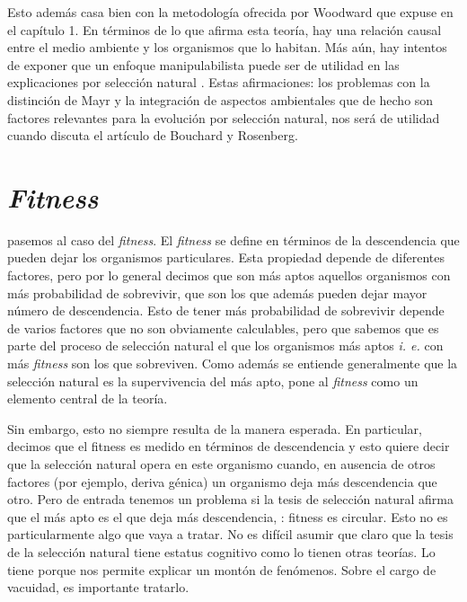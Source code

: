 Esto además casa bien con la metodología ofrecida por Woodward que expuse en el capítulo 1. En términos de lo que afirma esta teoría, hay una relación causal entre el medio ambiente y los organismos que lo habitan. Más aún, hay intentos de exponer que un enfoque manipulabilista puede ser de utilidad en las explicaciones por selección natural \cite{MacColl2011}. Estas afirmaciones: los problemas con la distinción de Mayr y la integración de aspectos ambientales que de hecho son factores relevantes para la evolución por selección natural, nos será de utilidad cuando discuta el artículo de Bouchard y Rosenberg.


\section{\emph{Fitness}}

\noindent pasemos al caso del \emph{fitness}. El \emph{fitness} se define en términos de la descendencia que pueden dejar los organismos particulares. Esta propiedad depende de diferentes factores, pero por lo general decimos que son más aptos aquellos organismos con más probabilidad de sobrevivir, que son los que además pueden dejar mayor número de descendencia. Esto de tener más probabilidad de sobrevivir depende de varios factores que no son obviamente calculables, pero que sabemos que es parte del proceso de selección natural el que los organismos más aptos \emph{i. e.} con más \emph{fitness} son los que sobreviven. Como además se entiende generalmente que la selección natural es la supervivencia del más apto, pone al \emph{fitness} como un elemento central de la teoría.

Sin embargo, esto no siempre resulta de la manera esperada. En particular, decimos que el fitness es medido en términos de descendencia y esto quiere decir que la selección natural opera en este organismo cuando, en ausencia de otros factores (por ejemplo, deriva génica) un organismo deja más descendencia que otro. Pero de entrada tenemos un problema si la tesis de selección natural afirma que el más apto es el que deja más descendencia, : fitness es circular. Esto no es particularmente algo que vaya a tratar. No es difícil asumir que claro que la tesis de la selección natural tiene estatus cognitivo como lo tienen otras teorías. Lo tiene porque nos permite explicar un montón de fenómenos. Sobre el cargo de vacuidad, es importante tratarlo.

